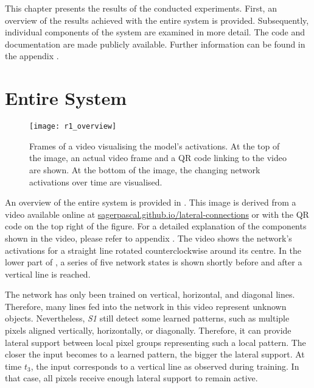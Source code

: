 This chapter presents the results of the conducted experiments. First, an overview of the results achieved with the entire system is provided. Subsequently, individual components of the system are examined in more detail.
The code and documentation are made publicly available. Further information can be found in the appendix .

\section{Entire System}
%
\begin{figure}[h]
    \centering
    \texttt{[image: r1\_overview]}
    \caption[Frames of a video visualising the model's activations]{Frames of a video visualising the model's activations. At the top of the image, an actual video frame and a QR code linking to the video are shown. At the bottom of the image, the changing network activations over time are visualised.}
\end{figure}
%
An overview of the entire system is provided in .
This image is derived from a video available online at \href{https://sagerpascal.github.io/lateral-connections/results/final_results.html#video-visualisations}{sagerpascal.github.io/lateral-connections} or with the QR code on the top right of the figure.
For a detailed explanation of the components shown in the video, please refer to appendix .
The video shows the network's activations for a straight line rotated counterclockwise around its centre.
In the lower part of , a series of five network states is shown shortly before and after a vertical line is reached.

The network has only been trained on vertical, horizontal, and diagonal lines.
Therefore, many lines fed into the network in this video represent unknown objects.
Nevertheless, \emph{S1} still detect some learned patterns, such as multiple pixels aligned vertically, horizontally, or diagonally.
Therefore, it can provide lateral support between local pixel groups representing such a local pattern.
The closer the input becomes to a learned pattern, the bigger the lateral support.
At time $t_3$, the input corresponds to a vertical line as observed during training.
In that case, all pixels receive enough lateral support to remain active.

